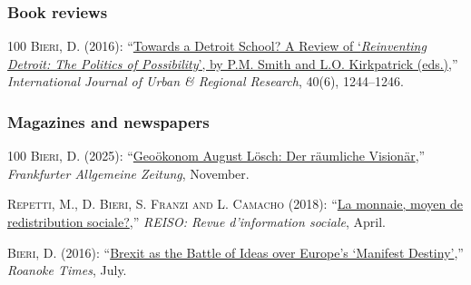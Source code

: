 \documentclass[letter,11pt]{article}
\begin{document}
\subsubsection*{Book reviews}
\begingroup
\renewcommand{\section}[2]{}
\begin{thebibliography}{100}
\textsc{Bieri, D.} (2016): \enquote{\href{http://onlinelibrary.wiley.com/doi/10.1111/1468-2427.12428/full}{Towards a Detroit School? A Review of \enquote{\emph{Reinventing Detroit: The Politics of Possibility}}, by P.M. Smith and L.O. Kirkpatrick (eds.)},} \emph{International Journal of Urban \& Regional Research}, 40(6), 1244--1246.
\end{thebibliography}
\endgroup


\subsubsection*{Magazines and newspapers}
\begingroup
\renewcommand{\section}[2]{}
\begin{thebibliography}{100}
\textsc{Bieri, D.} (2025): \enquote{\href{https://www.faz.net/aktuell/wirtschaft/geooekonom-august-loesch-der-raeumliche-visionaer-accg-110760868.html}{Geo\"{o}konom August L\"{o}sch: Der r\"{a}umliche Vision\"{a}r},} \emph{Frankfurter Allgemeine Zeitung}, November.

\textsc{Repetti, M., D. Bieri, S. Franzi {\small and} L. Camacho} (2018): \enquote{\href{https://www.reiso.org/articles/themes/politiques/2989-la-monnaie-moyen-de-redistribution-sociale}{La monnaie, moyen de redistribution sociale?},} \emph{REISO: Revue d'information sociale}, April.

\textsc{Bieri, D.} (2016): \enquote{\href{http://www.roanoke.com/opinion/commentary/bieri-brexit-as-the-battle-of-ideas-over-europe-s/article_6dd34600-a9de-573d-8bf9-b9b9ec17370f.html}{Brexit as the Battle of Ideas over Europe's \enquote{Manifest Destiny}},} \emph{Roanoke Times}, July.
\end{thebibliography}
\endgroup
\end{document}
